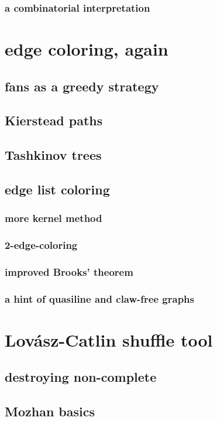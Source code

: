 \documentclass{amsbook}
\theoremstyle{plain}
\numberwithin{equation}{chapter}
\begin{document}
\subsection*{a combinatorial interpretation}

\chapter*{edge coloring, again}
\section*{fans as a greedy strategy}
\section*{Kierstead paths}
\section*{Tashkinov trees}
\section*{edge list coloring}
\subsection*{more kernel method}
\subsection*{2-edge-coloring}
\subsection*{improved Brooks' theorem}
\subsection*{a hint of quasiline and claw-free graphs}

\chapter*{Lov\'{a}sz-Catlin shuffle tool}
\section*{destroying non-complete}
\section*{Mozhan basics}
\end{document}
